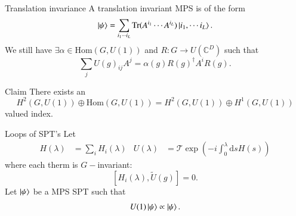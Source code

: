 \documentclass{beamer}
\newcommand{\CC}{\mathbb{C}}
\newcommand{\dd}{\mathrm{d}}
\begin{document}
\begin{frame}{Translation invariance}
A translation invariant MPS is of the form
\[\ket{\psi}=\sum_{i_1\cdots i_L}\textrm{Tr}(A^{i_1}\cdots A^{i_L})\ket{i_1,\cdots i_L}.\]
\pause
We still have $\exists \alpha\in\text{Hom}(G,U(1))$ and $R:G\rightarrow U(\CC^D)$ such that
 \[\sum_j U(g)_{ij}A^j=\alpha(g) R(g)^\dagger A^i R(g).\]
\pause
\begin{block}{Claim}
There exists an
\[H^2(G,U(1))\oplus \text{Hom}(G,U(1))=H^2(G,U(1))\oplus H^1(G,U(1))\]
valued index.
\end{block}
\end{frame}

\begin{frame}{Loops of SPT's}
Let
\begin{align}
H(\lambda)&= \sum_i H_i(\lambda)&U(\lambda)&= \mathcal{T}\exp(-i\int_0^\lambda \dd s H(s))
\end{align}
where each therm is $G-$invariant:
\[[H_i(\lambda),\tilde{U}(g)]=0.\]
\pause
Let $\ket{\psi}$ be a MPS SPT such that
\[U(1)\ket{\psi}\propto \ket{\psi}.\]
\end{frame}
\end{document}
